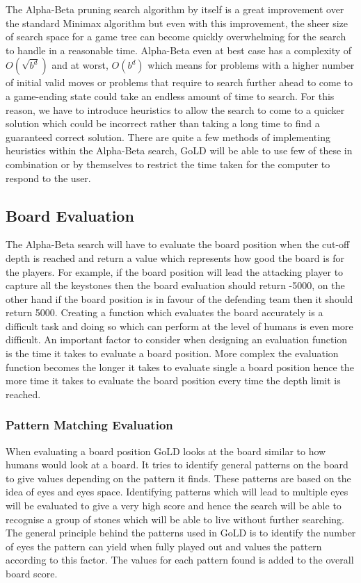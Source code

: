 \documentclass{l4proj}
\begin{document}
The Alpha-Beta pruning search algorithm by itself is a great improvement over the standard Minimax algorithm but even with this improvement, the sheer size of search space for a game tree can become quickly overwhelming for the search to handle in a reasonable time. Alpha-Beta even at best case has a complexity of $O(\sqrt{b^d})$ and at worst, $O(b^d)$  which means for problems with a higher number of initial valid moves or problems that require to search further ahead to come to a game-ending state could take an endless amount of time to search. For this reason, we have to introduce heuristics to allow the search to come to a quicker solution which could be incorrect rather than taking a long time to find a guaranteed correct solution. There are quite a few methods of implementing heuristics within the Alpha-Beta search, GoLD will be able to use few of these in combination or by themselves to restrict the time taken for the computer to respond to the user.

\subsection{Board Evaluation}
The Alpha-Beta search will have to evaluate the board position when the cut-off depth is reached and return a value which represents how good the board is for the players. For example, if the board position will lead the attacking player to capture all the keystones then the board evaluation should return -5000,   on the other hand if the board position is in favour of the defending team then it should return 5000. Creating a function which evaluates the board accurately is a difficult task and doing so which can perform at the level of humans is even more difficult. An important factor to consider when designing an evaluation function is the time it takes to evaluate a board position. More complex the evaluation function becomes the longer it takes to evaluate single a board position hence the more time it takes to evaluate the board position every time the depth limit is reached.

\subsubsection{Pattern Matching Evaluation}

When evaluating a board position GoLD looks at the board similar to how humans would look at a board. It tries to identify general patterns on the board to give values depending on the pattern it finds. These patterns are based on the idea of eyes and eyes space. Identifying patterns which will lead to multiple eyes will be evaluated to give a very high score and hence the search will be able to recognise a group of stones which will be able to live without further searching. The general principle behind the patterns used in GoLD is to identify the number of eyes the pattern can yield when fully played out and values the pattern according to this factor. The values for each pattern found is added to the overall board score.
\end{document}
